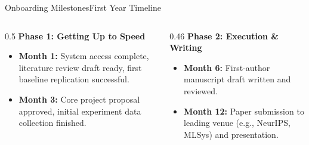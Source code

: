 \begin{frame}{Onboarding Milestones}{First Year Timeline}
  \begin{columns}[T]
    \begin{column}{0.5\textwidth}
      \textbf{Phase 1: Getting Up to Speed}
      \begin{itemize}
        \item \textbf{Month 1:} System access complete, literature review draft ready, first baseline replication successful.
        \item \textbf{Month 3:} Core project proposal approved, initial experiment data collection finished.
      \end{itemize}
    \end{column}
    
    \begin{column}{0.46\textwidth}
      \textbf{Phase 2: Execution \& Writing}
      \begin{itemize}
        \item \textbf{Month 6:} First-author manuscript draft written and reviewed.
        \item \textbf{Month 12:} Paper submission to leading venue (e.g., NeurIPS, MLSys) and presentation.
      \end{itemize}
    \end{column}
  \end{columns}
\end{frame}
